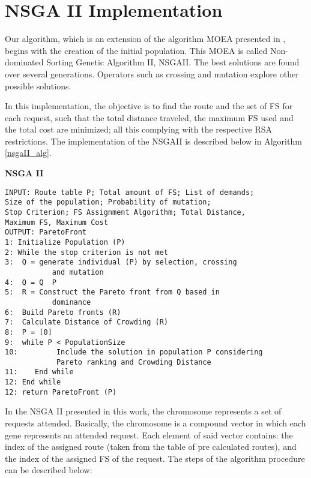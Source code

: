 \section{NSGA II Implementation }

Our algorithm, which is an extension of the algorithm MOEA presented
in \cite{engopt}, begins with the creation of the initial population.
This MOEA is called Non-dominated Sorting Genetic Algorithm II, NSGAII.
The best solutions are found over several generations. Operators such
as crossing and mutation explore other possible solutions. 

In this implementation, the objective is to find the route and the
set of FS for each request, such that the total distance traveled,
the maximum FS used and the total cost are minimized; all this complying
with the respective RSA restrictions. The implementation of the NSGAII
is described below in Algorithm \ref{nsgaII_alg}. 
\begin{center}
\begin{algorithm}[H]
\begin{raggedright}
\caption{\textbf{NSGA II}}
\par\end{raggedright}
\begin{lstlisting}
INPUT: Route table P; Total amount of FS; List of demands; 
Size of the population; Probability of mutation; 
Stop Criterion; FS Assignment Algorithm; Total Distance, 
Maximum FS, Maximum Cost 
OUTPUT: ParetoFront 
1: Initialize Population (P) 
2: While the stop criterion is not met 
3: 	Q = generate individual (P) by selection, crossing 
		   and mutation 
4: 	Q = Q  P 
5: 	R = Construct the Pareto front from Q based in 
		   dominance 
6: 	Build Pareto fronts (R) 
7: 	Calculate Distance of Crowding (R) 
8: 	P = [0] 
9: 	while P < PopulationSize 
10: 		Include the solution in population P considering 
			Pareto ranking and Crowding Distance 
11:    End while 
12: End while 
12: return ParetoFront (P) 
\end{lstlisting}
\label{nsgaII_alg}
\end{algorithm}
\par\end{center}

In the NSGA II presented in this work, the chromosome represents a
set of requests attended. Basically, the chromosome is a compound
vector in which each gene represents an attended request. Each element
of said vector contains: the index of the assigned route (taken from
the table of pre calculated routes), and the index of the assigned
FS of the request. The steps of the algorithm procedure can be described
below:

